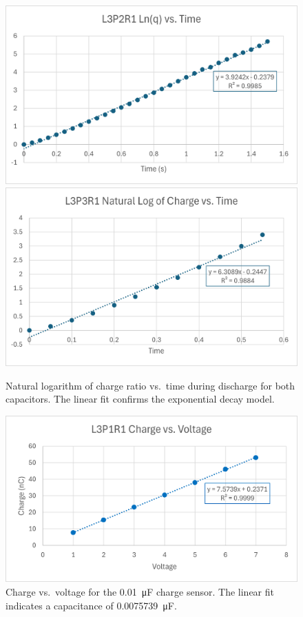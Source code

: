 \documentclass[11pt]{article}
\begin{document}
\begin{figure}[H]
    \centering
    \includegraphics[width=0.8\linewidth]{../figures/L3P2R1_ln(Q)vT.png}\\
    \includegraphics[width=0.8\linewidth]{../figures/L3P3R1_ln(Q)vT.png}
    \caption{Natural logarithm of charge ratio vs.\ time during discharge for both capacitors. The linear fit confirms the exponential decay model.}
    \label{fig:ln(Q)vT}
\end{figure}

\begin{figure}[H]
    \centering
    \includegraphics[width=0.8\linewidth]{../figures/L3P1R1_QvV.png}
    \caption{Charge vs.\ voltage for the \SI{0.01}{\micro\farad} charge sensor. The linear fit indicates a capacitance of \SI{0.0075739}{\micro\farad}.}
    \label{fig:QvV}
\end{figure}
\end{document}
